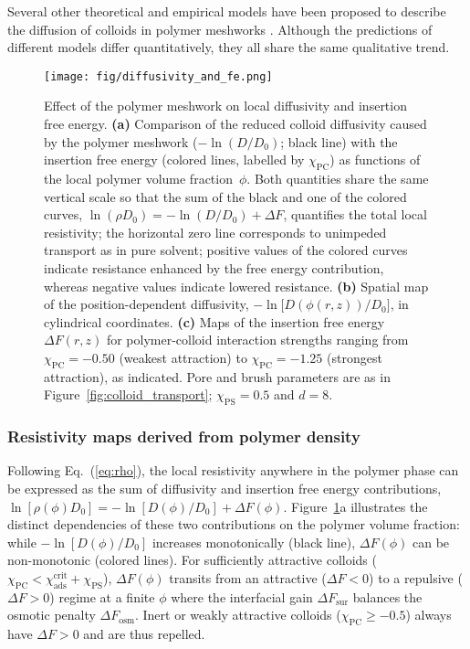 \documentclass[12pt, a4paper]{article}
\begin{document}
Several other theoretical and empirical models have been proposed to describe the diffusion of colloids in polymer meshworks \cite{Schweizer2003,Kohli2012,Holyst2009,Phillies1988}.
Although the predictions of different models differ quantitatively, they all share the same qualitative trend.

\begin{figure}
    \centering
    \centerline{\texttt{[image: fig/diffusivity\_and\_fe.png]}}
    \caption{%
        Effect of the polymer meshwork on local diffusivity and insertion free energy.  
        \textbf{(a)}  Comparison of the reduced colloid diffusivity caused by the polymer meshwork ($-\ln(D/D_{0})$; black line) with the insertion free energy (colored lines, labelled by $\chi_{\text{PC}}$) as functions of the local polymer volume fraction~$\phi$.  
        Both quantities share the same vertical scale  so that the sum of the black and one of the colored curves,  $\ln(\rho D_{0}) = -\ln(D/D_{0}) + \Delta F$, quantifies the total local resistivity; the horizontal zero line corresponds to unimpeded transport as in pure solvent; positive values of the colored curves indicate resistance enhanced by the free energy contribution, whereas negative values indicate lowered resistance.
        \textbf{(b)}  Spatial map of the position-dependent diffusivity, $-\ln\bigl[D(\phi(r,z))/D_{0}\bigr]$, in cylindrical coordinates.  
        \textbf{(c)}  Maps of the insertion free energy $\Delta F(r,z)$ for polymer-colloid interaction strengths ranging from $\chi_{\text{PC}}=-0.50$ (weakest attraction) to $\chi_{\text{PC}}=-1.25$ (strongest attraction), as indicated.
        Pore and brush parameters are as in Figure~\ref{fig:colloid_transport}; $\chi_{\text{PS}}=0.5$ and $d=8$.
    }
    \label{fig:D_fe_map}
\end{figure}


\subsubsection{Resistivity maps derived from polymer density}

Following Eq.~(\ref{eq:rho}), the local resistivity anywhere in the polymer phase can be expressed as the sum of diffusivity and insertion free energy contributions, $\ln[\rho(\phi)D_{0}] = -\ln[D(\phi)/D_{0}] + \Delta F(\phi)$.
Figure~\ref{fig:D_fe_map}a illustrates the distinct dependencies of these two contributions on the polymer volume fraction: while $-\ln[D(\phi)/D_{0}]$ increases monotonically (black line), $\Delta F(\phi)$ can be non-monotonic (colored lines).
For sufficiently attractive colloids ($\chi_{\text{PC}} < \chi_{\text{ads}}^{\text{crit}} + \chi_{\text{PS}}$), $\Delta F(\phi)$ transits from an attractive ($\Delta F<0$) to a repulsive ($\Delta F>0$) regime at a finite $\phi$ where the interfacial gain $\Delta F_{\text{sur}}$ balances the osmotic penalty $\Delta F_{\text{osm}}$.
Inert or weakly attractive colloids ($\chi_{\text{PC}} \geq -0.5$) always have $\Delta F>0$ and are thus repelled.  
\end{document}
